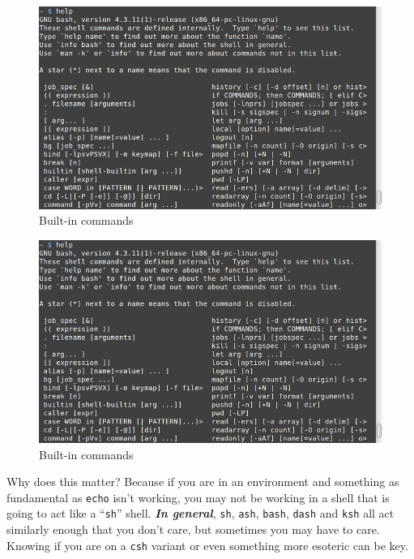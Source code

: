 \documentclass[10pt,]{book}
\numberwithin{figure}{chapter}
\begin{document}
\ifxetex

\begin{figure}[!htbp]
\includegraphics{./images/help.png}%
\caption{Built-in commands}%
\end{figure}

\else

\begin{figure}[htbp]
\centering
\includegraphics{./images/help.png}
\caption{Built-in commands}
\end{figure}

\fi

Why does this matter? Because if you are in an environment and something
as fundamental as \texttt{echo} isn't working, you may not be working in
a shell that is going to act like a ``\texttt{sh}'' shell.
\textbf{\emph{In general}}, \texttt{sh}, \texttt{ash}, \texttt{bash},
\texttt{dash} and \texttt{ksh} all act similarly enough that you don't
care, but sometimes you may have to care. Knowing if you are on a
\texttt{csh} variant or even something more esoteric can be key.
\end{document}
